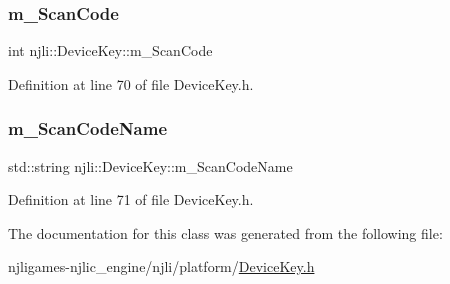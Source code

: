 \subsubsection{\texorpdfstring{m\+\_\+\+Scan\+Code}{m\_ScanCode}}
{\footnotesize\ttfamily int njli\+::\+Device\+Key\+::m\+\_\+\+Scan\+Code\hspace{0.3cm}{\ttfamily [private]}}



Definition at line 70 of file Device\+Key.\+h.

\mbox{\label{classnjli_1_1_device_key_ac619bfe3e166c9f9ddda4e308f4315d9}} 
\subsubsection{\texorpdfstring{m\+\_\+\+Scan\+Code\+Name}{m\_ScanCodeName}}
{\footnotesize\ttfamily std\+::string njli\+::\+Device\+Key\+::m\+\_\+\+Scan\+Code\+Name\hspace{0.3cm}{\ttfamily [private]}}



Definition at line 71 of file Device\+Key.\+h.



The documentation for this class was generated from the following file\+:\begin{DoxyCompactItemize}
\item 
njligames-\/njlic\+\_\+engine/njli/platform/\mbox{\hyperlink{_device_key_8h}{Device\+Key.\+h}}\end{DoxyCompactItemize}
